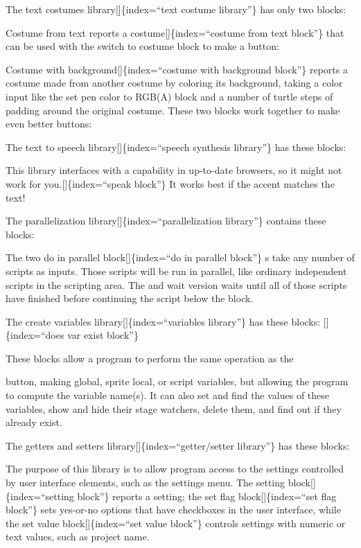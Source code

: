 \documentclass[
  letterpaper,
]{book}
\begin{document}
The text costumes library{[}{]}\{index=``text costume library''\} has
only two blocks:

Costume from text reports a costume{[}{]}\{index=``costume from text
block''\} that can be used with the switch to costume block to make a
button:

Costume with background{[}{]}\{index=``costume with background block''\}
reports a costume made from another costume by coloring its background,
taking a color input like the set pen color to RGB(A) block and a number
of turtle steps of padding around the original costume. These two blocks
work together to make even better buttons:

The text to speech library{[}{]}\{index=``speech synthesis library''\}
has these blocks:

This library interfaces with a capability in up-to-date browsers, so it
might not work for you.{[}{]}\{index=``speak block''\} It works best if
the accent matches the text!

The parallelization library{[}{]}\{index=``parallelization library''\}
contains these blocks:

The two do in parallel block{[}{]}\{index=``do in parallel block''\} s
take any number of scripts as inputs. Those scripts will be run in
parallel, like ordinary independent scripts in the scripting area. The
and wait version waits until all of those scripts have finished before
continuing the script below the block.

The create variables library{[}{]}\{index=``variables library''\} has
these blocks: {[}{]}\{index=``does var exist block''\}

These blocks allow a program to perform the same operation as the

button, making global, sprite local, or script variables, but allowing
the program to compute the variable name(s). It can also set and find
the values of these variables, show and hide their stage watchers,
delete them, and find out if they already exist.

The getters and setters library{[}{]}\{index=``getter/setter library''\}
has these blocks:

The purpose of this library is to allow program access to the settings
controlled by user interface elements, such as the settings menu. The
setting block{[}{]}\{index=``setting block''\} reports a setting; the
set flag block{[}{]}\{index=``set flag block''\} sets yes-or-no options
that have checkboxes in the user interface, while the set value
block{[}{]}\{index=``set value block''\} controls settings with numeric
or text values, such as project name.
\end{document}
